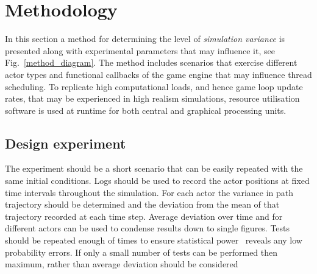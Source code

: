 \section{Methodology} \label{s:methodology}

In this section a method for determining the level of \textit{simulation variance} is presented along with experimental parameters that may influence it, see Fig.~\ref{method_diagram}. The method includes scenarios that exercise different actor types and functional callbacks of the game engine that may influence thread scheduling. To replicate high computational loads, and hence game loop update rates, that may be experienced in high realism simulations, resource utilisation software is used at runtime for both central and graphical processing units.

%

\subsection{Design experiment}
The experiment should be a short scenario that can be easily repeated with the same initial conditions. Logs should be used to record the actor positions at fixed time intervals throughout the simulation. For each actor the variance in path trajectory should be determined and the deviation from the mean of that trajectory recorded at each time step. Average deviation over time and for different actors can be used to condense results down to single figures. Tests should be repeated enough of times to ensure statistical power~\cite{cohen2013statistical} reveals any low probability errors. If only a small number of tests can be performed  then maximum, rather than average deviation should be considered 

